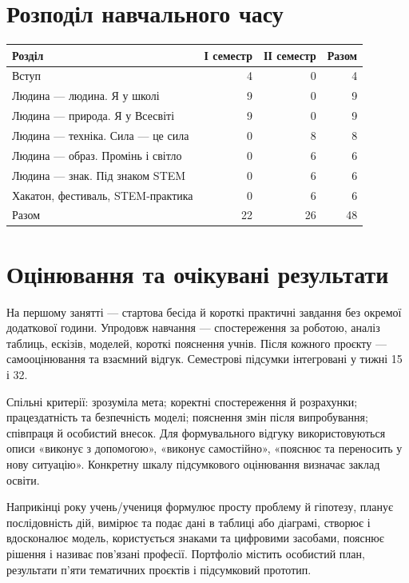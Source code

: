 \documentclass[10pt,a4paper,landscape]{article}
\begin{document}
\section*{Розподіл навчального часу}
\begin{tabular}{P{125mm}rrr}
\toprule Розділ & І семестр & ІІ семестр & Разом \\\midrule
Вступ & 4 & 0 & 4 \\
Людина — людина. Я у школі & 9 & 0 & 9 \\
Людина — природа. Я у Всесвіті & 9 & 0 & 9 \\
Людина — техніка. Сила — це сила & 0 & 8 & 8 \\
Людина — образ. Промінь і світло & 0 & 6 & 6 \\
Людина — знак. Під знаком STEM & 0 & 6 & 6 \\
Хакатон, фестиваль, STEM-практика & 0 & 6 & 6 \\
\midrule Разом & 22 & 26 & 48 \\
\bottomrule\end{tabular}
\section*{Оцінювання та очікувані результати}
На першому занятті — стартова бесіда й короткі практичні завдання без окремої додаткової години. Упродовж навчання — спостереження за роботою, аналіз таблиць, ескізів, моделей, короткі пояснення учнів. Після кожного проєкту — самооцінювання та взаємний відгук. Семестрові підсумки інтегровані у тижні 15 і 32.

Спільні критерії: зрозуміла мета; коректні спостереження й розрахунки; працездатність та безпечність моделі; пояснення змін після випробування; співпраця й особистий внесок. Для формувального відгуку використовуються описи «виконує з допомогою», «виконує самостійно», «пояснює та переносить у нову ситуацію». Конкретну шкалу підсумкового оцінювання визначає заклад освіти.

Наприкінці року учень/учениця формулює просту проблему й гіпотезу, планує послідовність дій, вимірює та подає дані в таблиці або діаграмі, створює і вдосконалює модель, користується знаками та цифровими засобами, пояснює рішення і називає пов’язані професії. Портфоліо містить особистий план, результати п’яти тематичних проєктів і підсумковий прототип.
\newpage
\end{document}
